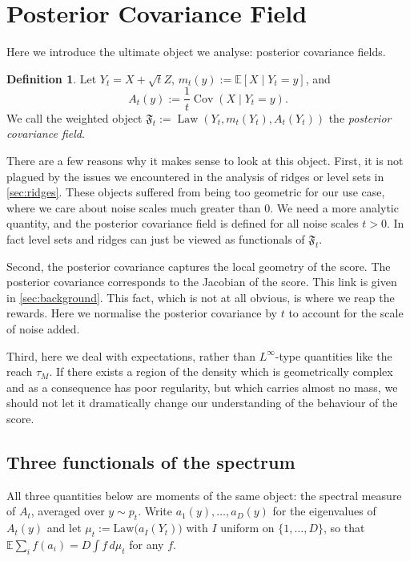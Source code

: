 \documentclass{article}
\DeclareMathOperator{\Cov}{Cov}
\DeclareMathOperator{\Law}{Law}
\newcommand{\E}{\mathbb{E}}
\theoremstyle{plain}
\theoremstyle{definition}
\newtheorem{definition}[theorem]{Definition}
\theoremstyle{remark}
\begin{document}
\newpage

\section{Posterior Covariance Field}
\label{sec:pcf}

Here we introduce the ultimate object we analyse: posterior covariance fields.

\begin{definition}
    Let $Y_t = X + \sqrt{t} Z$, $m_t(y) := \E\left[X \mid Y_t=y\right]$, and
    \[
    A_t(y) := \frac{1}{t} \Cov\left(X \mid Y_t=y\right).
    \]
    We call the weighted object $\mathfrak{F}_t := \Law\left(Y_t, m_t\left(Y_t\right), A_t\left(Y_t\right)\right)$ the \emph{posterior covariance field}. 
\end{definition}

There are a few reasons why it makes sense to look at this object. First, it is not plagued by the issues we encountered in the analysis of ridges or level sets in \autoref{sec:ridges}. These objects suffered from being too geometric for our use case, where we care about noise scales much greater than 0. We need a more analytic quantity, and the posterior covariance field is defined for all noise scales $t>0$. In fact level sets and ridges can just be viewed as functionals of $\mathfrak{F}_t$. 

Second, the posterior covariance captures the local geometry of the score. The posterior covariance corresponds to the Jacobian of the score. This link is given in \autoref{sec:background}. This fact, which is not at all obvious, is where we reap the rewards. Here we normalise the posterior covariance by $t$ to account for the scale of noise added. 

Third, here we deal with expectations, rather than $L^\infty$-type quantities like the reach $\tau_M$. If there exists a region of the density which is geometrically complex and as a consequence has poor regularity, but which carries almost no mass, we should not let it dramatically change our understanding of the behaviour of the score.

\subsection{Three functionals of the spectrum}

All three quantities below are moments of the same object: the spectral
measure of $A_t$, averaged over $y \sim p_t$. Write $a_1(y),\dots,a_D(y)$
for the eigenvalues of $A_t(y)$ and let
$\mu_t := \mathrm{Law}\bigl(a_I(Y_t)\bigr)$ with $I$ uniform on
$\{1,\dots,D\}$, so that $\E\sum_i f(a_i) = D\int f\,d\mu_t$ for any
$f$.
\end{document}
